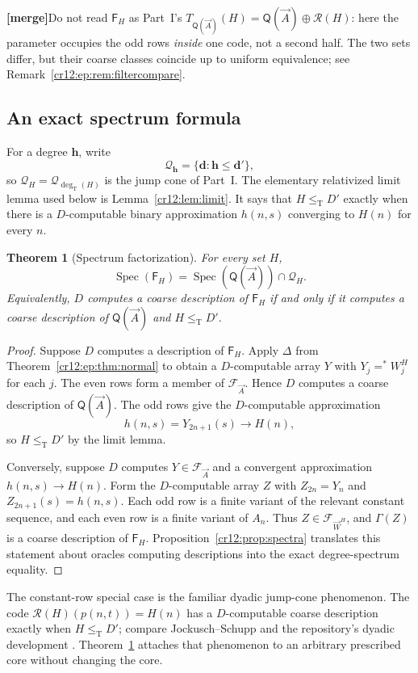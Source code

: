 \documentclass[11pt,letterpaper]{article}
\theoremstyle{plain}
\newtheorem{theorem}{Theorem}[section]
\theoremstyle{definition}
\theoremstyle{remark}
\numberwithin{equation}{section}
\newcommand{\leT}{\leq_{\mathrm T}}
\newcommand{\Spec}{\operatorname{Spec}}
\newcommand{\degT}{\deg_{\mathrm T}}
\newcommand{\Rcode}{\mathcal R}
\newcommand{\mergenote}[1]{\par\smallskip\noindent
 {\small\textsf{\textbf{[merge]}}\enspace #1}\par\smallskip}
\newcommand{\QQ}{\mathsf Q}              %
\newcommand{\Fint}{\mathsf F}            %
\newcommand{\FF}{\mathcal F}             %
\newcommand{\WW}{\vec W}                 %
\begin{document}
\mergenote{Do not read $\Fint_H$ as Part~I's $T_{\QQ(\vec A)}(H)=\QQ(\vec A)\oplus\Rcode(H)$:
here the parameter occupies the odd rows \emph{inside} one code, not a second half.
The two sets differ, but their coarse classes coincide up to uniform equivalence;
see Remark~\ref{cr12:ep:rem:filtercompare}.}

\subsection{An exact spectrum formula}
For a degree $\mathbf h$, write
\[
 \mathcal Q_{\mathbf h}=\{\mathbf d:\mathbf h\le\mathbf d'\},
\]
so $\mathcal Q_H=\mathcal Q_{\degT(H)}$ is the jump cone of Part~I. The elementary
relativized limit lemma used below is Lemma~\ref{cr12:lem:limit}. It says that
$H\leT D'$ exactly when there is a $D$-computable binary approximation $h(n,s)$
converging to $H(n)$ for every $n$.

\begin{theorem}[Spectrum factorization]\label{cr12:ep:thm:factorization}
For every set $H$,
\begin{equation}\label{cr12:ep:eq:factorization}
 \Spec(\Fint_H)=\Spec(\QQ(\vec A))\cap\mathcal Q_H.
\end{equation}
Equivalently, $D$ computes a coarse description of $\Fint_H$ if and only if it
computes a coarse description of $\QQ(\vec A)$ and $H\leT D'$.
\end{theorem}
\begin{proof}
Suppose $D$ computes a description of $\Fint_H$. Apply $\Delta$ from
Theorem~\ref{cr12:ep:thm:normal} to obtain a $D$-computable array $Y$ with
$Y_j=^*W^H_j$ for each $j$. The even rows form a member of $\FF_{\vec A}$. Hence $D$
computes a coarse description of $\QQ(\vec A)$. The odd rows give the $D$-computable
approximation
\[
 h(n,s)=Y_{2n+1}(s)\longrightarrow H(n),
\]
so $H\leT D'$ by the limit lemma.

Conversely, suppose $D$ computes $Y\in\FF_{\vec A}$ and a convergent approximation
$h(n,s)\to H(n)$. Form the $D$-computable array $Z$ with $Z_{2n}=Y_n$ and
$Z_{2n+1}(s)=h(n,s)$. Each odd row is a finite variant of the relevant constant
sequence, and each even row is a finite variant of $A_n$. Thus $Z\in\FF_{\WW^H}$, and
$\Gamma(Z)$ is a coarse description of $\Fint_H$. Proposition~\ref{cr12:prop:spectra}
translates this statement about oracles computing descriptions into the exact
degree-spectrum equality.
\end{proof}

The constant-row special case is the familiar dyadic jump-cone phenomenon. The code
$\Rcode(H)(p(n,t))=H(n)$ has a $D$-computable coarse description exactly when
$H\leT D'$; compare Jockusch--Schupp \cite{JS} and the repository's dyadic
development \cite{Repo}. Theorem~\ref{cr12:ep:thm:factorization} attaches that
phenomenon to an arbitrary prescribed core without changing the core.
\end{document}
